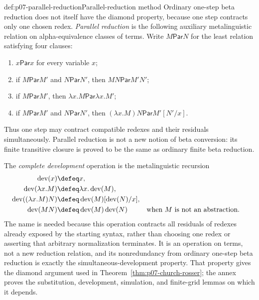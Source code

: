 \begin{hbmethod}{def:p07-parallel-reduction}{Parallel-reduction method}
Ordinary one-step beta reduction does not itself have the diamond property,
because one step contracts only one chosen redex.  \emph{Parallel reduction}
is the following auxiliary metalinguistic relation on alpha-equivalence
classes of terms.  Write \(M\mathrel{\mathsf{Par}}N\) for the least relation
satisfying four clauses:
\begin{enumerate}
  \item \(x\mathrel{\mathsf{Par}}x\) for every variable \(x\);
  \item if \(M\mathrel{\mathsf{Par}}M'\) and
        \(N\mathrel{\mathsf{Par}}N'\), then
        \(MN\mathrel{\mathsf{Par}}M'N'\);
  \item if \(M\mathrel{\mathsf{Par}}M'\), then
        \(\lambda x.M\mathrel{\mathsf{Par}}\lambda x.M'\);
  \item if \(M\mathrel{\mathsf{Par}}M'\) and
        \(N\mathrel{\mathsf{Par}}N'\), then
        \((\lambda x.M)N\mathrel{\mathsf{Par}}M'[N'/x]\).
\end{enumerate}
Thus one step may contract compatible redexes and their residuals
simultaneously.  Parallel reduction is not a new notion of beta conversion:
its finite transitive closure is proved to be the same as ordinary finite
beta reduction.

The \emph{complete development} operation is the metalinguistic recursion
\[
\begin{aligned}
 \operatorname{dev}(x)&\defeq x,\\
 \operatorname{dev}(\lambda x.M)&\defeq
   \lambda x.\operatorname{dev}(M),\\
 \operatorname{dev}((\lambda x.M)N)&\defeq
   \operatorname{dev}(M)[\operatorname{dev}(N)/x],\\
 \operatorname{dev}(MN)&\defeq
   \operatorname{dev}(M)\operatorname{dev}(N)
   &&\text{when \(M\) is not an abstraction.}
\end{aligned}
\]
The name is needed because this operation contracts all residuals of redexes
already exposed by the starting syntax, rather than choosing one redex or
asserting that arbitrary normalization terminates.  It is an operation on
terms, not a new reduction relation, and its nonredundancy from ordinary
one-step beta reduction is exactly the simultaneous-development property.
That property gives the diamond argument used in
Theorem~\ref{thm:p07-church-rosser}; the annex proves the substitution,
development, simulation, and finite-grid lemmas on which it depends.
\end{hbmethod}

